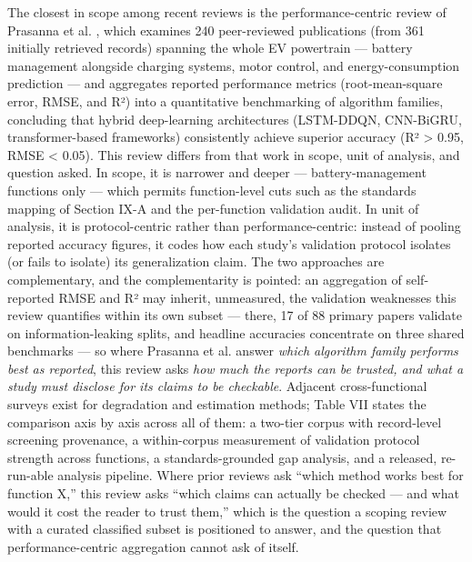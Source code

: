\documentclass[journal]{IEEEtran}
\begin{document}
The closest in scope among recent reviews is the performance-centric review of Prasanna et al. \cite{r27}, which examines 240 peer-reviewed publications (from 361 initially retrieved records) spanning the whole EV powertrain --- battery management alongside charging systems, motor control, and energy-consumption prediction --- and aggregates reported performance metrics (root-mean-square error, RMSE, and R²) into a quantitative benchmarking of algorithm families, concluding that hybrid deep-learning architectures (LSTM-DDQN, CNN-BiGRU, transformer-based frameworks) consistently achieve superior accuracy (R² > 0.95, RMSE < 0.05). This review differs from that work in scope, unit of analysis, and question asked. In scope, it is narrower and deeper --- battery-management functions only --- which permits function-level cuts such as the standards mapping of Section IX-A and the per-function validation audit. In unit of analysis, it is protocol-centric rather than performance-centric: instead of pooling reported accuracy figures, it codes how each study's validation protocol isolates (or fails to isolate) its generalization claim. The two approaches are complementary, and the complementarity is pointed: an aggregation of self-reported RMSE and R² may inherit, unmeasured, the validation weaknesses this review quantifies within its own subset --- there, 17 of 88 primary papers validate on information-leaking splits, and headline accuracies concentrate on three shared benchmarks --- so where Prasanna et al. answer \textit{which algorithm family performs best as reported}, this review asks \textit{how much the reports can be trusted, and what a study must disclose for its claims to be checkable}. Adjacent cross-functional surveys exist for degradation and estimation methods; Table VII states the comparison axis by axis across all of them: a two-tier corpus with record-level screening provenance, a within-corpus measurement of validation protocol strength across functions, a standards-grounded gap analysis, and a released, re-run-able analysis pipeline. Where prior reviews ask ``which method works best for function X,'' this review asks ``which claims can actually be checked --- and what would it cost the reader to trust them,'' which is the question a scoping review with a curated classified subset is positioned to answer, and the question that performance-centric aggregation cannot ask of itself.
\end{document}
